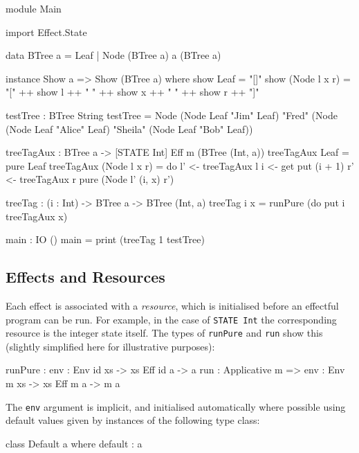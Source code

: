 \begin{code}[float=h,frame=single,caption={Tree tagging}, label=introprog]
module Main

import Effect.State

data BTree a = Leaf
             | Node (BTree a) a (BTree a)

instance Show a => Show (BTree a) where
    show Leaf = "[]"
    show (Node l x r) = "[" ++ show l ++ " "
                            ++ show x ++ " "
                            ++ show r ++ "]"

testTree : BTree String
testTree = Node (Node Leaf "Jim" Leaf)
              "Fred"
              (Node (Node Leaf "Alice" Leaf)
                    "Sheila"
                    (Node Leaf "Bob" Leaf))

treeTagAux : BTree a -> { [STATE Int] } Eff m (BTree (Int, a))
treeTagAux Leaf = pure Leaf
treeTagAux (Node l x r)
  = do l' <- treeTagAux l
       i <- get
       put (i + 1)
       r' <- treeTagAux r
       pure (Node l' (i, x) r')

treeTag : (i : Int) -> BTree a -> BTree (Int, a)
treeTag i x = runPure (do put i
                          treeTagAux x)

main : IO () 
main = print (treeTag 1 testTree) 
\end{code}


\subsection{Effects and Resources}

Each effect is associated with a \emph{resource}, which is initialised before
an effectful program can be run. For example, in the case of \texttt{STATE Int}
the corresponding resource is the integer state itself.
The types of \texttt{runPure} and \texttt{run} show this (slightly
simplified here for illustrative purposes):

\begin{code}
runPure : {env : Env id xs} -> { xs } Eff id a -> a
run : Applicative m => {env : Env m xs} -> { xs } Eff m a -> m a
\end{code}

\noindent
The \texttt{env} argument is implicit, and initialised automatically where
possible using default values given by instances of the following type class:

\begin{code}
class Default a where
    default : a
\end{code}

